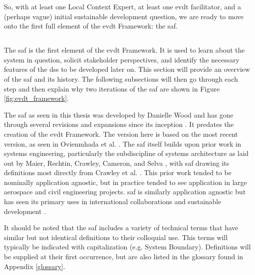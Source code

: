 So, with at least one Local Context Expert, at least one \ac{evdt} facilitator, and a (perhaps vague) initial sustainable development question, we are ready to move onto the first full element of the \ac{evdt} Framework: the \ac{saf}.


\subsection{} \label{sec:saf}

The \acf{saf} is the first element of the \ac{evdt} Framework. It is used to learn about the system in question, solicit stakeholder perspectives, and identify the necessary features of the \ac{dss} to be developed later on. This section will provide an overview of the \ac{saf} and its history. The following subsections will then go through each step and then explain why two iterations of the \ac{saf} are shown in Figure \ref{fig:evdt_framework}.

The \ac{saf} as seen in this thesis was developed by Danielle Wood and has gone through several revisions and expansions since its inception \cite{woodAnalysisTechnologyTransfer2013, woodApplyingSystemsArchitecture2014, kazanskyCurrentPotentialRole2016}. It predates the creation of the \ac{evdt} Framework. The version here is based on the most recent version, as seen in Ovienmhada et al. \cite{ovienmhadaInclusiveDesignEarth2021}. The \ac{saf} itself builds upon prior work in systems engineering, particularly the subdiscipline of systems architecture as laid out by Maier, Rechtin, Crawley, Cameron, and Selva \cite{crawley2004, crawleySystemArchitectureStrategy2015, maierArtSystemsArchitecting2009}, with \ac{saf} drawing its definitions most directly from Crawley et al. \cite{crawley2004}. This prior work tended to be nominally application agnostic, but in practice tended to see application in large aerospace and civil engineering projects. \ac{saf} is similarly application agnostic but has seen its primary uses in international collaborations \cite{pfotenhauerArchitectingComplexInternational2016} and sustainable development \cite{ovienmhadaInclusiveDesignEarth2021}. 

It should be noted that the \ac{saf} includes a variety of technical terms that have similar but not identical definitions to their colloquial use. This terms will typically be indicated with capitalization (e.g. System Boundary). Definitions will be supplied at their first occurrence, but are also listed in the glossary found in Appendix \ref{glossary}.


